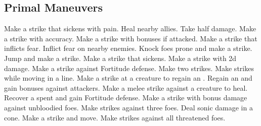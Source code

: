 \subsection{Primal Maneuvers}\label{Primal Maneuvers}
\begin{spelllist}
 Make a strike that sickens with pain.
 Heal nearby allies.
 Take half damage.
 Make a strike with  accuracy.
 Make a strike with bonuses if attacked.
 Make a strike that inflicts fear.
 Inflict fear on nearby enemies.
 Knock foes prone and make a strike.
 Jump and make a strike.
 Make a strike that sickens.
 Make a strike with \plus2d damage.
 Make a strike against Fortitude defense.
 Make two strikes.
 Make strikes while moving in a line.
 Make a strike at a creature to regain an .
 Regain an  and gain bonuses against attackers.
 Make a melee strike against a creature to heal.
 Recover a spent  and gain  Fortitude defense.
 Make a strike with bonus damage against unbloodied foes.
 Make strikes against three foes.
 Deal sonic damage in a cone.
 Make a strike and move.
 Make strikes against all threatened foes.
\end{spelllist}



\small
